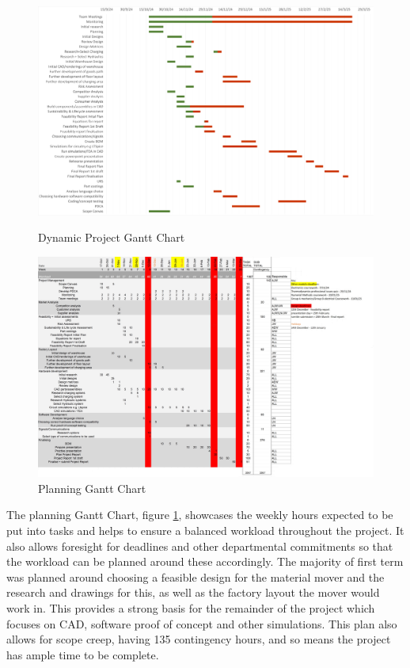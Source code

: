 \documentclass[12pt]{article}
\begin{document}
\begin{figure}[ht]
    \centering
    \begin{minipage}{0.45\linewidth}
        \centering
        \includegraphics[width=\linewidth]{BIGGER Gantt chart.png} %
        \caption{Dynamic Project Gantt Chart}
        \label{fig:x}
    \end{minipage}
    \hspace{0.05\linewidth}
    \begin{minipage}{0.45\linewidth}
        \centering
        \includegraphics[width=\linewidth]{Gantt plan final.jpg}
        \caption{Planning Gantt Chart}
        \label{fig:y}
    \end{minipage}
\end{figure}
The planning Gantt Chart, figure \ref{fig:y}, showcases the weekly hours expected to be put into tasks and helps to ensure a balanced workload throughout the project. It also allows foresight for deadlines and other departmental commitments so that the workload can be planned around these accordingly. The majority of first term was planned around choosing a feasible design for the material mover and the research and drawings for this, as well as the factory layout the mover would work in. This provides a strong basis for the remainder of the project which focuses on CAD, software proof of concept and other simulations. This plan also allows for scope creep, having 135 contingency hours, and so means the project has ample time to be complete. 
\end{document}
